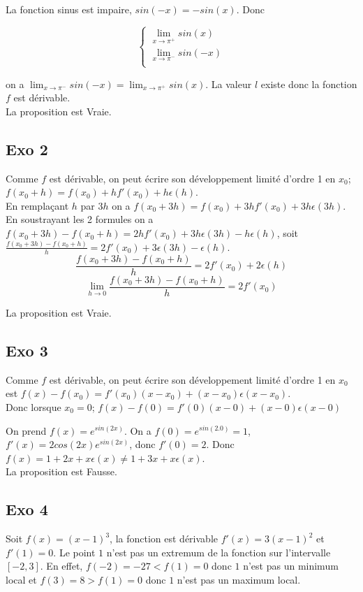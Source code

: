 \documentclass[]{book}
\theoremstyle{definition}
\begin{document}
La fonction sinus est impaire, $sin(-x) = -sin(x)$. Donc

$$ 
\left\{ 
\begin{array}{l}
 \lim_{x \to \pi^{+}} sin(x) \\
 \lim_{x \to \pi^{-}} sin(-x) \\
\end{array}
\right. 
$$

on a $\lim_{x \to \pi^{-}} sin(-x) = \lim_{x \to \pi^{+}} sin(x)$. La valeur $l$ existe donc la fonction $f$ est d\'erivable.\\


La proposition est Vraie.

\subsection*{Exo 2}
Comme $f$ est d\'erivable, on peut \'ecrire son d\'eveloppement limit\'e d'ordre 1 en $x_0$; $f(x_0+h) = f(x_0) + hf'(x_0) + h\epsilon(h)$.\\

En rempla\c{c}ant $h$ par $3h$ on a $f(x_0+3h) = f(x_0) + 3hf'(x_0) + 3h\epsilon(3h) $.\\
En soustrayant les 2 formules on a $f(x_0+3h)-f(x_0+h) = 2hf'(x_0) + 3h\epsilon(3h)- h\epsilon(h)$, soit $\frac{f(x_0+3h)-f(x_0+h)}{h} = 2f'(x_0) + 3\epsilon(3h) - \epsilon(h)$.\\

$$\frac{f(x_0+3h)-f(x_0+h)}{h} = 2f'(x_0) + 2\epsilon(h)$$
$$\lim_{h \to 0} \frac{f(x_0+3h)-f(x_0+h)}{h} = 2f'(x_0)$$

La proposition est Vraie.

\subsection*{Exo 3}
Comme $f$ est d\'erivable, on peut \'ecrire son d\'eveloppement limit\'e d'ordre 1 en $x_0$ est $f(x) - f(x_0) = f'(x_0)(x - x_0) + (x - x_0)\epsilon(x - x_0)$.\\
Donc lorsque $x_0 = 0$; $f(x) - f(0) = f'(0)(x - 0) + (x - 0)\epsilon(x - 0)$

On prend $f(x) = e^{sin(2x)}$. On a $f(0) = e^{sin(2.0)} = 1$, $f'(x) = 2cos(2x)e^{sin(2x)}$, donc $f'(0) = 2$. Donc $f(x) = 1 + 2x + x\epsilon(x) \neq 1 + 3x + x\epsilon(x) $.\\

La proposition est Fausse.


\subsection*{Exo 4}
Soit $f(x) = (x-1)^3$, la fonction est d\'erivable $f'(x)=3(x-1)^2$ et $f'(1) = 0$. Le point $1$ n'est pas un extremum de la fonction sur l'intervalle $[-2,3]$. En effet, $f(-2) = -27 < f(1) = 0$ donc $1$ n'est pas un minimum local et $f(3) = 8 > f(1) = 0$ donc $1$ n'est pas un maximum local.\\
\end{document}
